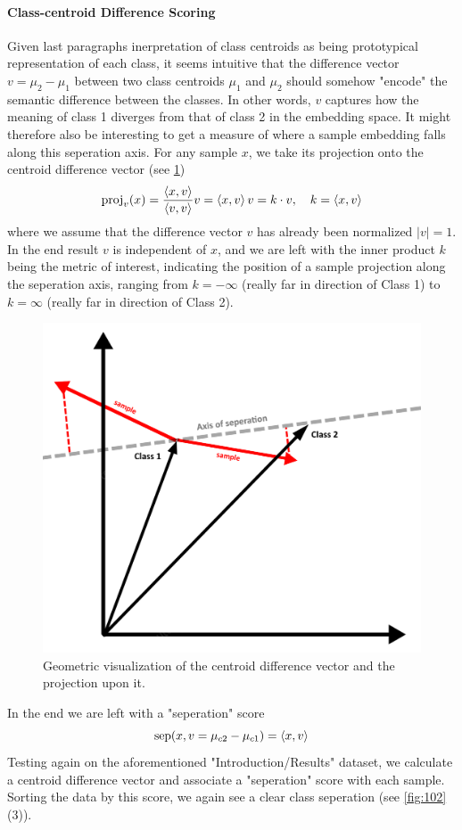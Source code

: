 \paragraph{Class-centroid Difference Scoring}
Given last paragraphs inerpretation of class centroids as being prototypical representation of each class, it seems intuitive that the difference vector $v = \mu_2-\mu_1$ between two class centroids $\mu_{1}$ and $\mu_{2}$ should somehow "encode" the semantic difference between the classes. In other words, $v$ captures how the meaning of class 1 diverges from that of class 2 in the embedding space. It might therefore also be interesting to get a measure of where a sample embedding falls along this seperation axis. For any sample $x$, we take its projection onto the centroid difference vector (see \cref{fig:103})
\begin{equation}
    \text{proj}_{v}(x) = \frac{\braket{x, v}}{\braket{v, v}}v = \braket{x, v}v = k\cdot v, \quad k = \braket{x, v}
\end{equation}
where we assume that the difference vector $v$ has already been normalized $|v| = 1$. In the end result $v$ is independent of $x$, and we are left with the inner product $k$ being the metric of interest, indicating the position of a sample projection along the seperation axis, ranging from $k = -\infty$ (really far in direction of Class 1) to $k = \infty$ (really far in direction of Class 2).
\begin{figure}%
    \centering
    \includegraphics[width=0.5\linewidth]{media/vec_diff_graphic.png}
    \caption{Geometric visualization of the centroid difference vector and the projection upon it.}
    \label{fig:103}
\end{figure}
In the end we are left with a "seperation" score
\begin{equation}
    \text{sep}(x, v =\mu_{c2}-\mu_{c1}) = \braket{x, v}
\end{equation}
Testing again on the aforementioned "Introduction/Results" dataset, we calculate a centroid difference vector and associate a "seperation" score with each sample. Sorting the data by this score, we again see a clear class seperation (see \cref{fig:102} (3)).

